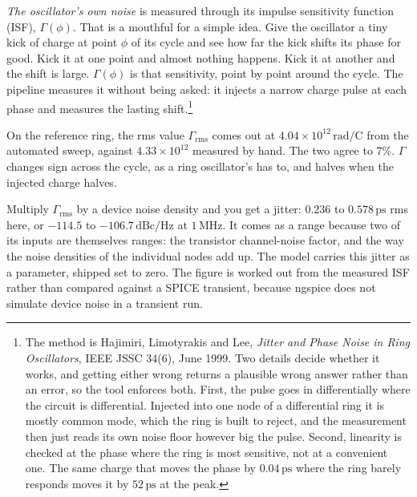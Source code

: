 \documentclass[11pt,a4paper]{article}
\newcommand{\unit}[1]{\,\textrm{#1}}
\begin{document}
\begin{itemize}[leftmargin=1.5em,itemsep=0.3em]
        \emph{The oscillator's own noise} is measured through its
        impulse sensitivity function (ISF), $\Gamma(\phi)$. That is a
        mouthful for a simple idea. Give the oscillator a tiny kick of
        charge at point $\phi$ of its cycle and see how far the kick
        shifts its phase for good. Kick it at one point and almost
        nothing happens. Kick it at another and the shift is large.
        $\Gamma(\phi)$ is that sensitivity, point by point around the
        cycle. The pipeline measures it without being asked: it
        injects a narrow charge pulse at each phase and measures the
        lasting shift.\footnote{%
        The method is Hajimiri, Limotyrakis and Lee, \emph{Jitter and
        Phase Noise in Ring Oscillators}, IEEE JSSC 34(6), June 1999.
        Two details decide whether it works, and getting either wrong
        returns a plausible wrong answer rather than an error, so the
        tool enforces both. First, the pulse goes in differentially
        where the circuit is differential. Injected into one node of a
        differential ring it is mostly common mode, which the ring is
        built to reject, and the measurement then just reads its own
        noise floor however big the pulse. Second, linearity is checked
        at the phase where the ring is most sensitive, not at a
        convenient one. The same charge that moves the phase by
        $0.04\unit{ps}$ where the ring barely responds moves it by
        $52\unit{ps}$ at the peak.}

        On the reference ring, the rms value $\Gamma_{\mathrm{rms}}$
        comes out at $4.04\times10^{12}\unit{rad/C}$ from the automated
        sweep, against $4.33\times10^{12}$ measured by hand. The two
        agree to $7\%$. $\Gamma$ changes sign across the cycle, as a
        ring oscillator's has to, and halves when the injected charge
        halves.

        Multiply $\Gamma_{\mathrm{rms}}$ by a device noise density and
        you get a jitter: $0.236$ to $0.578\unit{ps}$ rms here, or
        $-114.5$ to $-106.7\unit{dBc/Hz}$ at $1\unit{MHz}$. It comes as
        a range because two of its inputs are themselves ranges: the
        transistor channel-noise factor, and the way the noise
        densities of the individual nodes add up. The model carries
        this jitter as a parameter, shipped set to zero. The figure is
        worked out from the measured ISF rather than compared against a
        SPICE transient, because ngspice does not simulate device noise
        in a transient run.


\end{itemize}
\end{document}
